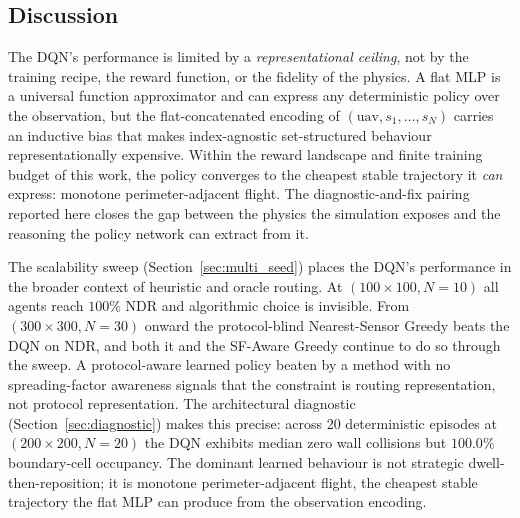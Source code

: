 \subsection{Discussion}
\label{sec:discussion}

The DQN's performance is limited by a \emph{representational ceiling}, not by the training recipe, the reward function, or the fidelity of the physics. A flat MLP is a universal function approximator and can express any deterministic policy over the observation, but the flat-concatenated encoding of $(\mathrm{uav}, s_1, \ldots, s_N)$ carries an inductive bias that makes index-agnostic set-structured behaviour representationally expensive. Within the reward landscape and finite training budget of this work, the policy converges to the cheapest stable trajectory it \emph{can} express: monotone perimeter-adjacent flight. The diagnostic-and-fix pairing reported here closes the gap between the physics the simulation exposes and the reasoning the policy network can extract from it.

The scalability sweep (Section~\ref{sec:multi_seed}) places the DQN's performance in the broader context of heuristic and oracle routing. At $(100{\times}100, N{=}10)$ all agents reach $100\%$ NDR and algorithmic choice is invisible. From $(300{\times}300, N{=}30)$ onward the protocol-blind Nearest-Sensor Greedy beats the DQN on NDR, and both it and the SF-Aware Greedy continue to do so through the sweep. A protocol-aware learned policy beaten by a method with no spreading-factor awareness signals that the constraint is routing representation, not protocol representation. The architectural diagnostic (Section~\ref{sec:diagnostic}) makes this precise: across 20 deterministic episodes at $(200{\times}200, N{=}20)$ the DQN exhibits median zero wall collisions but $100.0\%$ boundary-cell occupancy. The dominant learned behaviour is not strategic dwell-then-reposition; it is monotone perimeter-adjacent flight, the cheapest stable trajectory the flat MLP can produce from the observation encoding.

